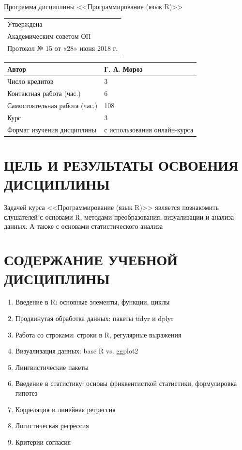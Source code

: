 \documentclass[a4paper]{article}
\begin{document}
\begin{center}
{\Large Программа дисциплины <<Программирование (язык R)>>}
\end{center}
\begin{flushright}
\begin{tabular}{l}
Утверждена                          \\
Академическим советом ОП            \\
Протокол № 15 от  «28» июня 2018 г.
\end{tabular}
\end{flushright}
\begin{center}
\begin{tabular}{|l|l|}
\hline
Автор                         & Г. А. Мороз                    \\ \hline
Число кредитов                &                        3       \\ \hline
Контактная работа (час.)      &                   6           \\ \hline
Самостоятельная работа (час.) &               108               \\ \hline
Курс                          & 3 \\ \hline
Формат изучения дисциплины    & с использования онлайн-курса \\ \hline
\end{tabular}
\end{center}
\section{ЦЕЛЬ И РЕЗУЛЬТАТЫ ОСВОЕНИЯ ДИСЦИПЛИНЫ}
Задачей курса <<Программирование (язык R)>> является познакомить слушателей с основами R, методами преобразования, визуализации и анализа данных. А также с основами статистического анализа
\section{СОДЕРЖАНИЕ УЧЕБНОЙ ДИСЦИПЛИНЫ}
\begin{enumerate}
\item Введение в R: основные элементы, функции, циклы
\item  Продвинутая обработка данных: пакеты tidyr и dplyr
\item  Работа со строками: строки в R, регулярные выражения
\item Визуализация данных: base R vs. ggplot2
\item  Лингвистические пакеты
\item  Введение в статистику: основы фриквентисткой статистики, формулировка гипотез
\item  Корреляция и линейная регрессия
\item  Логистическая регрессия  
\item  Критерии согласия
\end{enumerate}
\end{document}
